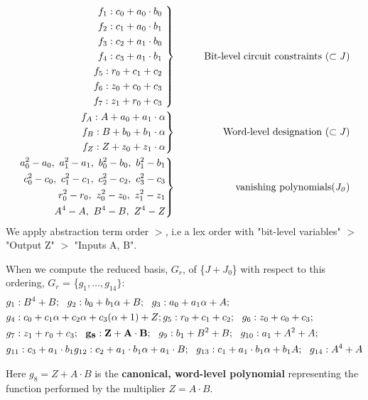 \begin{Example}
\begin{eqnarray}
 \left .  
	\begin{aligned}
		f_1:c_0+a_0 \cdot b_0  \\
		f_2:c_1+a_0 \cdot b_1  \\
		f_3:c_2+a_1 \cdot b_0  \\
		f_4:c_3+a_1 \cdot b_1  \\
		f_5:r_0+c_1 + c_2		\\
		f_6:z_0+c_0 + c_3		\\
		f_7:z_1+r_0 + c_3		
	\end{aligned} 
 \ \right\}
 &\qquad&  {\it  \text{Bit-level circuit constraints} ~(\subset J)} \nonumber \\
 \left . 
	\begin{aligned}
		f_{A}:A+a_0+a_1\cdot \alpha   \\ 
		f_{B}:B+b_0+b_1\cdot \alpha  \\ 
		f_{Z}:Z+z_0+z_1\cdot \alpha   
	\end{aligned} 
 \right\}
 &\qquad&  {\it  \text{Word-level designation} ~(\subset J)} \nonumber \\
  \left . 
	\begin{aligned}
		a_0^2-a_0, ~a_1^2-a_1,~b_0^2-b_0, ~b_1^2-b_1   \\ 
		c_0^2-c_0, ~c_1^2-c_1,~c_2^2-c_2, ~c_3^2-c_3  \\ 
		r_0^2-r_0, ~z_0^2-z_0,~z_1^2-z_1    \\ 
		A^4-A, ~B^4-B ,~Z^4-Z		  
	\end{aligned} 
 \right\}
 &\qquad&  {\it \text{vanishing polynomials} (J_0)} \nonumber
\end{eqnarray}
We apply abstraction term order $>$, i.e a lex order with
"bit-level variables" $>$ "Output Z" $>$ "Inputs A, B".

When we compute the reduced \Grobner basis, $G_r$, of \{$J + J_0$\} with 
respect to this ordering, $G_r$ = \{$g_1, \dots, g_{14}\}:$
\begin{align*}
&g_1: B^4+B; 
~~g_2: b_0+b_1 \alpha + B; 
~~g_3: a_0+a_1 \alpha + A;  \nonumber \\
&g_4: c_0+c_1 \alpha + c_2 \alpha + c_3(\alpha+1)+Z;
g_5: r_0+c_1+c_2; 
~~g_6: z_0+c_0+c_3; \nonumber \\
&g_7: z_1+r_0+c_3; 
~~{\bf g_8: Z+A\cdot B};
~~g_9: b_1+B^2+B; 
~~g_{10}: a_1+A^2+A; \nonumber \\
&g_{11}: c_3+a_1\cdot b_1
g_{12}: c_2+a_1\cdot b_1 \alpha + a_1 \cdot B; 
~~g_{13}: c_1+a_1\cdot b_1 \alpha +b_1 A; 
~~g_{14}: A^4+A  \nonumber
\end{align*}

Here $g_8=Z+A\cdot B$ is the {\bf canonical, word-level polynomial } 
representing the function performed by the multiplier $Z=A\cdot B$.
\end{Example}

